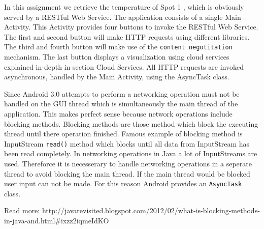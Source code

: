 \documentclass{report}
\begin{document}
	In this assignment we retrieve the temperature of Spot 1 \cite{temperatureSpot1}, which is obviously served by a RESTful Web Service. The application consists of a single Main Activity. This Activity provides four buttons to invoke the RESTful Web Service. The first and second button will make HTTP requests using different libraries. The third and fourth button will make use of the  \texttt{content negotitation} mechanism. The last button displays a visualization using cloud services explained in-depth in section Cloud Services. All HTTP requests are invoked asynchronous, handled by the Main Activity, using the AsyncTask class.

	Since Android 3.0 attempts to perform a networking operation must not be handled on the GUI thread which is simultaneously the main thread of the application. This makes perfect sense because network operations include blocking methods. Blocking methods are those method which block the executing thread until there operation finished. Famous example of blocking method is InputStream \texttt{read()} method which blocks until all data from InputStream has been read completely. In networking operations in Java a lot of InputStreams are used. Thereforce it is necesserary to handle networking operations in a seperate thread to avoid blocking the main thread. If the main thread would be blocked user input can not be made. For this reason Android provides an \texttt{AsyncTask} class.


Read more: http://javarevisited.blogspot.com/2012/02/what-is-blocking-methods-in-java-and.html#ixzz2iqmeIdKO
\end{document}
